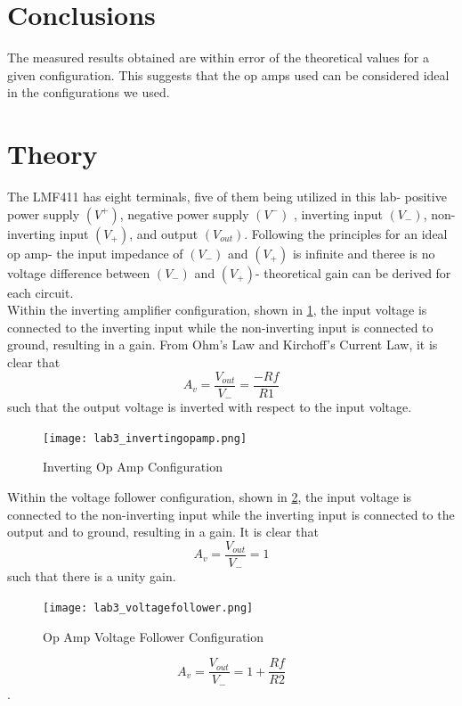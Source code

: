 \documentclass[prb,preprint]{revtex4-1}
\newcommand{\be}{\begin{equation}}
\newcommand{\ee}{\end{equation}}
\begin{document}
\section{Conclusions}
The measured results obtained are within error of the theoretical values for a given configuration.
This suggests that the op amps used can be considered ideal in the configurations we used. 

\section{Theory}
The LMF411 has eight terminals, five of them being utilized in this lab- positive power supply $(V^+)$, negative power supply $(V^-)$ , inverting input $(V_{-})$, non-inverting input $(V_{+})$, and output $(V_{out})$. Following the principles for an ideal op amp- the input impedance of $(V_{-})$ and $(V_{+})$ is infinite and theree is no voltage difference between  $(V_{-})$ and $(V_{+})$- theoretical gain can be derived for each circuit.\\

Within the inverting amplifier configuration, shown in \ref{fig1}, the input voltage is connected to the inverting input while the non-inverting input is connected to ground, resulting in a gain. From Ohm's Law and Kirchoff's Current Law, it is clear that
\be A_v=\frac{V_{out}}{V_{-}} = \frac{-Rf}{R1} \label{eq1} \ee such that the output voltage is inverted with respect to the input voltage. \\
 
\begin{figure} [ht]
\centering
\texttt{[image: lab3\_invertingopamp.png]}
\caption{Inverting Op Amp Configuration}
\label{fig1}
\end{figure}

Within the voltage follower configuration, shown in \ref{fig2}, the input voltage is connected to the non-inverting input while the inverting input is connected to the output and to ground, resulting in a gain. It is clear that 
\be A_v=\frac{V_{out}}{V_{-}} = 1 \label{eq2} \ee such that there is a unity gain. \\

\begin{figure} [ht]
\centering
\texttt{[image: lab3\_voltagefollower.png]}
\caption{ Op Amp Voltage Follower Configuration}
\label{fig2}
\end{figure}

\be A_v=\frac{V_{out}}{V_{-}} = 1+ \frac{Rf}{R2} \label{eq3} \ee.  \\
\end{document}
